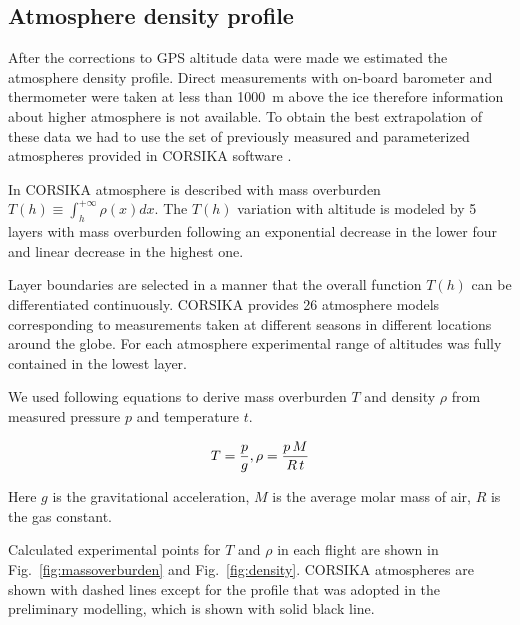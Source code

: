\documentclass[final,5p,times,twocolumn]{elsarticle}
\begin{document}
\subsection{Atmosphere density profile\label{sect:atmosphere-profile}}

After the corrections to GPS altitude data were made we estimated the atmosphere density profile. Direct measurements with on-board barometer and thermometer were taken at less than 1000~m above the ice therefore information about higher atmosphere is not available. To obtain the best extrapolation of these data we had to use the set of previously measured and parameterized atmospheres provided in CORSIKA software \cite{hec98}.

In CORSIKA atmosphere is described with mass overburden $T(h) \equiv \int_{h}^{+\infty} \rho(x) dx$. The $T(h)$ variation with altitude is modeled by 5 layers with mass overburden following an exponential decrease in the lower four and linear decrease in the highest one.


Layer boundaries are selected in a manner that the overall function $T(h)$ can be differentiated continuously. CORSIKA provides 26 atmosphere models corresponding to measurements taken at different seasons in different locations around the globe. For each atmosphere experimental range of altitudes was fully contained in the lowest layer.

We used following equations to derive mass overburden $T$ and density $\rho$ from measured pressure $p$ and temperature $t$.

\begin{equation}
T     = \frac{p}{g}, \\
\rho  = \frac{p \, M}{R \, t} \\
\end{equation}

Here $g$ is the gravitational acceleration, $M$ is the average molar mass of air, $R$ is the gas constant.

Calculated experimental points for $T$ and $\rho$ in each flight are shown in Fig.~\ref{fig:massoverburden} and Fig.~\ref{fig:density}. CORSIKA atmospheres are shown with dashed lines except for the profile that was adopted in the preliminary modelling, which is shown with solid black line.
\end{document}
